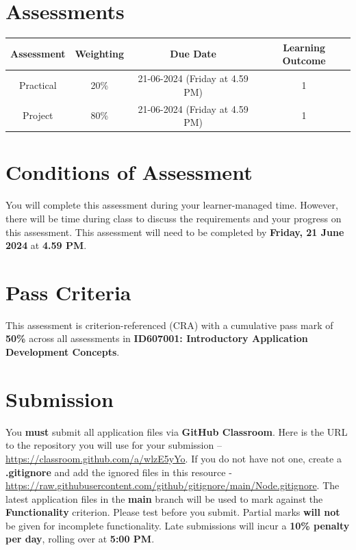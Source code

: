 \documentclass{article}
\begin{document}
\section*{Assessments}
\renewcommand{\arraystretch}{1.5}
\begin{tabular}{|c|c|c|c|}
	\hline
	\textbf{Assessment}                                 & \textbf{Weighting} & \textbf{Due Date}            & \textbf{Learning Outcome} \\ \hline
	\small Practical & \small 20\%        & \small 21-06-2024 (Friday at 4.59 PM)   & \small 1                   \\ \hline
	\small Project                 & \small 80\%        & \small 21-06-2024 (Friday at 4.59 PM) \small  & \small 1                   \\ \hline
\end{tabular}

\section*{Conditions of Assessment}
You will complete this assessment during your learner-managed time. However, there will be time during class to discuss the requirements and your progress on this assessment. This assessment will need to be completed by \textbf{Friday, 21 June 2024} at \textbf{4.59 PM}. 

\section*{Pass Criteria}
This assessment is criterion-referenced (CRA) with a cumulative pass mark of \textbf{50\%} across all assessments in \textbf{ID607001: Introductory Application Development Concepts}.

\section*{Submission}
You \textbf{must} submit all application files via \textbf{GitHub Classroom}. Here is the URL to the repository you will use for your submission – \href{https://classroom.github.com/a/wlzE5yYo}{https://classroom.github.com/a/wlzE5yYo}. If you do not have not one, create a \textbf{.gitignore} and add the ignored files in this resource - \href{https://raw.githubusercontent.com/github/gitignore/main/Node.gitignore}{https://raw.githubusercontent.com/github/gitignore/main/Node.gitignore}. The latest application files in the \textbf{main} branch will be used to mark against the \textbf{Functionality} criterion. Please test before you submit. Partial marks \textbf{will not} be given for incomplete functionality. Late submissions will incur a \textbf{10\% penalty per day}, rolling over at \textbf{5:00 PM}.
\end{document}

